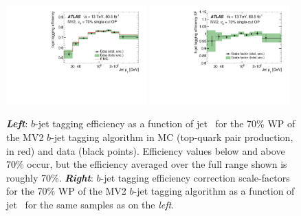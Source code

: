 \begin{figure}[!htb]
    \begin{center}
        \includegraphics[width=0.48\textwidth]{figures/chapter3/ftag/ftag_eff_70_pt}
        \includegraphics[width=0.48\textwidth]{figures/chapter3/ftag/ftag_sf_70_pt}
        \caption{
            \textbf{\textit{Left}}: $b$-jet tagging efficiency as a function of jet \pT~for the 70\% WP of the MV2 $b$-jet
                tagging algorithm in MC (top-quark pair production, in red) and data (black points).
                Efficiency values below and above 70\% occur, but the efficiency averaged over
                the full range shown is roughly 70\%. 
            \textbf{\textit{Right}}: $b$-jet tagging efficiency correction scale-factors for the 70\% WP of the MV2 $b$-jet
                tagging algorithm as a function of jet \pT~for the same
                samples as on the \textit{left}.
        }
        \label{fig:btag_eff_sf}
    \end{center}
\end{figure}

\FloatBarrier
